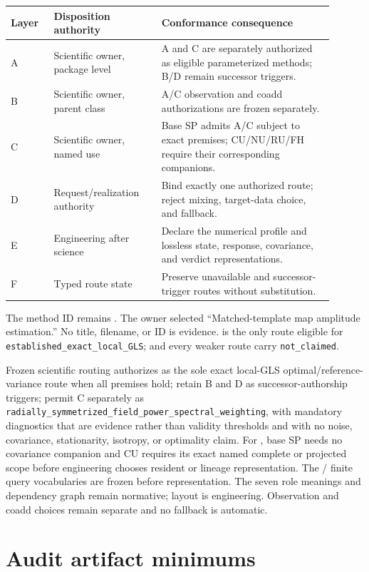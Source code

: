 \documentclass[10pt]{article}
\begin{document}
\begin{longtable}{p{0.12\linewidth}p{0.30\linewidth}p{0.48\linewidth}}
\toprule
Layer & Disposition authority & Conformance consequence \\
\midrule
\endhead
A & Scientific owner, package level & A and C are separately authorized as
eligible parameterized methods; B/D remain successor triggers. \\
B & Scientific owner, parent class & A/C observation and coadd authorizations
are frozen separately. \\
C & Scientific owner, named use & Base SP admits A/C subject to exact premises;
CU/NU/RU/FH require their corresponding companions. \\
D & Request/realization authority & Bind exactly one authorized route; reject
mixing, target-data choice, and fallback. \\
E & Engineering after science & Declare the numerical profile and lossless
state, response, covariance, and verdict representations. \\
F & Typed route state & Preserve unavailable and successor-trigger routes
without substitution. \\
\bottomrule
\end{longtable}

The method ID remains \ContractID{}. The owner selected
``Matched-template map amplitude estimation.'' No title, filename, or ID is
evidence.  is the only route eligible for
\texttt{established\_exact\_local\_GLS};  and every weaker route
carry \texttt{not\_claimed}.

Frozen scientific routing authorizes  as the sole exact
local-GLS optimal/reference-variance route when all premises hold; retain B and
D as successor-authorship triggers; permit C separately as
\texttt{radially\_symmetrized\_field\_power\_spectral\_weighting}, with
mandatory diagnostics that are evidence rather than validity thresholds and
with no noise, covariance, stationarity, isotropy, or optimality claim. For
, base SP needs no covariance companion and CU requires its exact named
complete or projected scope before engineering chooses resident or lineage
representation. The / finite query vocabularies are frozen
before representation. The
seven  role meanings and dependency graph remain normative; layout is
engineering. Observation and coadd choices remain separate and no fallback is
automatic.

\appendix
\section{Audit artifact minimums}
\end{document}

